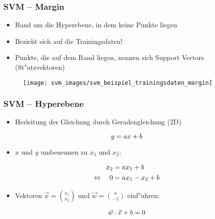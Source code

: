 \begin{frame}

\frametitle{SVM -- Margin}

\begin{itemize}
	\setlength{\itemsep}{5pt}
	\item \glqq Band\grqq{} um die Hyperebene, in dem keine Punkte liegen
	\item Bezieht sich auf die Trainingsdaten!
	\item Punkte, die auf dem Rand liegen, nennen sich Support Vectors (St"utzvektoren)
\end{itemize}

\begin{figure}[h]
\centering
\texttt{[image: svm\_images/svm\_beispiel\_trainingsdaten\_margin]}
\end{figure}

\end{frame}







\begin{frame}

\frametitle{SVM -- Hyperebene}

\begin{itemize}
	\item Herleitung der Gleichung durch Geradengleichung (2D)
\end{itemize}

\begin{equation}
	y=ax+b \notag
\end{equation}

\begin{itemize}
	\item $x$ und $y$ umbenennen zu $x_1$ und $x_2$:
\end{itemize}

\begin{equation}
	\begin{aligned}
					    \quad x_2 & = ax_1 + b \\
		\Leftrightarrow \quad 0   & = ax_1 - x_2 + b \notag
	\end{aligned}
\end{equation}

\begin{itemize}
	\item Vektoren $\vec{x} = \binom{x_1}{x_2}$ und $\vec{w} = \binom{a}{-1}$ einf"uhren:
\end{itemize}

\begin{equation}
	\vec{w} \cdot \vec{x} + b = 0 \notag
\end{equation}

\end{frame}







